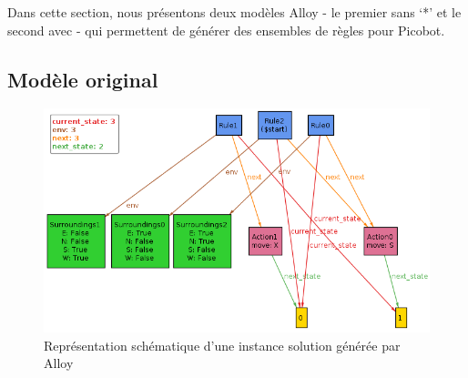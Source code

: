\documentclass{article}
\begin{document}
Dans cette section, nous présentons deux modèles Alloy - le premier sans ‘*’ et le second avec - qui permettent de générer des ensembles de règles pour Picobot.

\subsection{Modèle original}
\vspace{5mm}
\begin{figure}[H]
\centerline{
\includegraphics[scale=0.6]{pictures/Image3.png}}
\caption{Représentation schématique d'une instance solution générée par Alloy}
\end{figure}

\newpage
\end{document}
